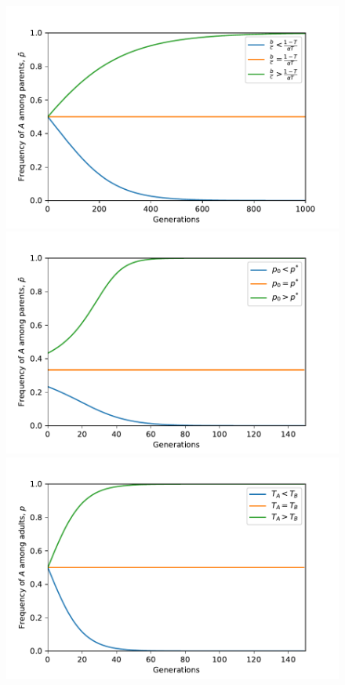 \documentclass[12pt]{extarticle}
\begin{document}
{%
\begin{figure}[htb]
  \centering
    \includegraphics[scale=0.7]{figure3a.pdf}
    \includegraphics[scale=0.7]{figure3b.pdf}
    \includegraphics[scale=0.7]{figure3c.pdf}

\end{figure}}
\end{document}
